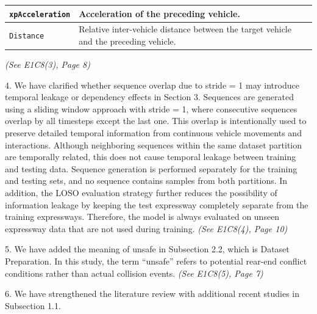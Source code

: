 \documentclass[12pt]{article}
\begin{document}
\begin{enumerate}
\begin{table}[H]
\begin{tabularx}{\textwidth}{|l|X|}
\texttt{xpAcceleration} &
Acceleration of the preceding vehicle. \\
\hline

\texttt{Distance} &
Relative inter-vehicle distance between the target vehicle and the preceding vehicle. \\
\hline

\end{tabularx}
\end{table}
\textit{(See E1C8(3), Page 8)}

4. We have clarified whether sequence overlap due to stride = 1 may introduce temporal leakage or dependency effects in Section 3. Sequences are generated using a sliding window approach with stride = 1, where consecutive sequences overlap by all timesteps except the last one. This overlap is intentionally used to preserve detailed temporal information from continuous vehicle movements and interactions. Although neighboring sequences within the same dataset partition are temporally related, this does not cause temporal leakage between training and testing data. Sequence generation is performed separately for the training and testing sets, and no sequence contains samples from both partitions. In addition, the LOSO evaluation strategy further reduces the possibility of information leakage by keeping the test expressway completely separate from the training expressways. Therefore, the model is always evaluated on unseen expressway data that are not used during training. \textit{(See E1C8(4), Page 10)}

5. We have added the meaning of unsafe in Subsection 2.2, which is Dataset Preparation. In this study, the term “unsafe” refers to potential rear-end conflict conditions rather than actual collision events. \textit{(See E1C8(5), Page 7)}

6. We have strengthened the literature review with additional recent studies in Subsection 1.1.


\end{enumerate}
\end{document}
